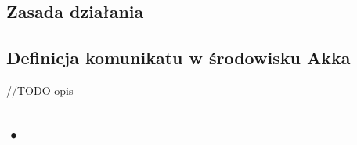 \subsection{Zasada działania}

\subsection{Definicja komunikatu w środowisku Akka}

//TODO opis

\subsection*{•}













